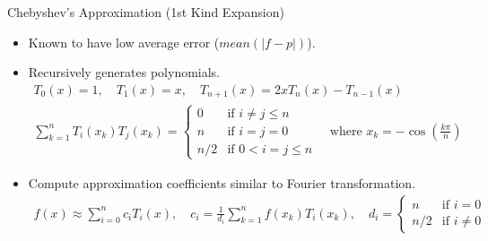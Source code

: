 \documentclass[9pt]{beamer}
\begin{document}
\begin{frame}{Chebyshev's Approximation (1st Kind Expansion)}
    \begin{itemize}
        \item \alert{Known to have low average error ($mean(|f-p|)$).}
        \item Recursively generates polynomials.
              \begin{gather*}
                  T_0(x) = 1, \quad T_1(x) = x, \quad T_{n+1}(x) = 2xT_n(x) - T_{n-1}(x) \\
                  \sum_{k=1}^n T_i(x_k) T_j(x_k) = \left\{
                  \begin{array}{ll}
                      0   & \text{if $i \neq j \leq n$}  \\
                      n   & \text{if $i = j = 0$}        \\
                      n/2 & \text{if $0 < i = j \leq n$}
                  \end{array} \right.
                  \quad \text{where } x_k = -\cos(\frac{k \pi}{n})
              \end{gather*}
        \item Compute approximation coefficients similar to Fourier transformation.
              \begin{gather*}
                  f(x) \approx \sum_{i=0}^n c_i T_i(x), \quad
                  c_i = \frac{1}{d_i} \sum_{k=1}^n f(x_k) T_i(x_k), \quad
                  d_i = \left\{
                  \begin{array}{ll}
                      n   & \text{if $i = 0$}    \\
                      n/2 & \text{if $i \neq 0$}
                  \end{array}
                  \right.
              \end{gather*}
    \end{itemize}
\end{frame}
\end{document}
